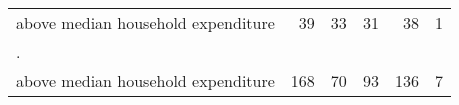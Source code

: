 \begin{table}[!h]
\begin{tabular}{llllll}
\multicolumn{1}{l}{\hspace{1em}above median household expenditure} &
  \multicolumn{1}{|r}{39} &
  \multicolumn{1}{r}{33} &
  \multicolumn{1}{r}{31} &
  \multicolumn{1}{r}{38} &
  \multicolumn{1}{r}{1} \\
\multicolumn{1}{l}{.} &
  \multicolumn{1}{|r}{} &
  \multicolumn{1}{r}{} &
  \multicolumn{1}{r}{} &
  \multicolumn{1}{r}{} &
  \multicolumn{1}{r}{} \\
\multicolumn{1}{l}{\hspace{1em}above median household expenditure} &
  \multicolumn{1}{|r}{168} &
  \multicolumn{1}{r}{70} &
  \multicolumn{1}{r}{93} &
  \multicolumn{1}{r}{136} &
  \multicolumn{1}{r}{7} \\
\cline{1-6}
\end{tabular}
\end{table}
